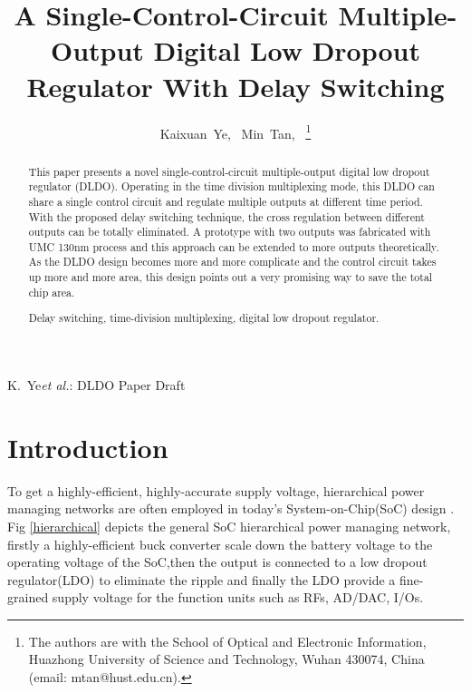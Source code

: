 \documentclass[draftcls, journal]{IEEEtran}
\begin{document}
\title{A Single-Control-Circuit Multiple-Output Digital Low Dropout Regulator With Delay Switching}
\author{
        Kaixuan~Ye,~
        Min~Tan,~%
\thanks{The authors are with the School of Optical and Electronic Information,
Huazhong University of Science and Technology, Wuhan 430074, China (email:
mtan@hust.edu.cn).}
        }

%
{K.~Ye\MakeLowercase{\textit{et al.}}: DLDO Paper Draft}


\maketitle

\begin{abstract}
This paper presents a novel single-control-circuit multiple-output digital low dropout regulator (DLDO). Operating in the time division multiplexing mode, this DLDO can share a single control circuit and regulate multiple outputs at different time period. With the proposed delay switching technique, the cross regulation between different outputs can be totally eliminated. A prototype with two outputs was fabricated with UMC 130nm process and this approach can be extended to more outputs theoretically. As the DLDO design becomes more and more complicate and the control circuit takes up more and more area, this design points out a very promising way to save the total chip area.\\

\begin{IEEEkeywords}
Delay switching, time-division multiplexing, digital low dropout regulator.
\end{IEEEkeywords}
\end{abstract}

\section{Introduction}
To get a highly-efficient, highly-accurate supply voltage, hierarchical power managing networks are often employed in today's System-on-Chip(SoC) design \cite{original,AALDO,AALDO1,coarse-fine,pipeline,asynchrounous,recursive}. Fig \ref{hierarchical} depicts the general SoC hierarchical power managing network, firstly a highly-efficient buck converter scale down the battery voltage to the operating voltage of the SoC,then the output is connected to a low dropout regulator(LDO) to eliminate the ripple and finally the LDO provide a fine-grained supply voltage for the function units such as RFs, AD/DAC, I/Os.
 
\end{document}
